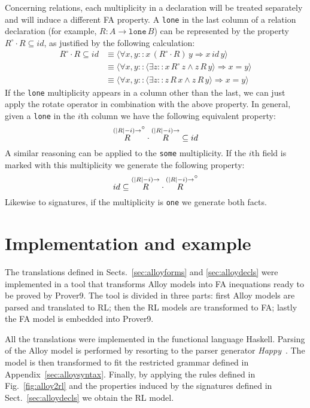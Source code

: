 \documentclass{llncs}
\begin{document}
Concerning relations, each multiplicity in a declaration will be
treated separately and will induce a different FA property. A
\texttt{lone} in the last column of a relation declaration (for
example, $R : A \rightarrow \mathtt{lone}\, B$) can be represented by
the property $R^\circ \cdot R \subseteq id$, as justified by the
following calculation:
\begin{align*}
  R^\circ \cdot R \subseteq id & \equiv \langle \forall x,y :: x\, (R^\circ \cdot R)\, y \Rightarrow x\, id\, y \rangle \\
  &  \equiv \langle \forall x,y :: \langle \exists z :: x\, R^\circ \, z \wedge z \, R\, y \rangle \Rightarrow x = y \rangle \\
  & \equiv \langle \forall x,y :: \langle \exists z :: z\, R \, x \wedge z \, R\, y \rangle \Rightarrow x = y \rangle
\end{align*}
If the \texttt{lone} multiplicity appears in a column other than the
last, we can just apply the rotate operator in combination with the above property. In general, given a \texttt{lone} in the $i$th column we have the following equivalent property:
\begin{equation*}
\nrotate{R}{(|R|-i)}^\circ \cdot \nrotate{R}{(|R|-i)} \subseteq id
\end{equation*}
A similar reasoning can be applied to the \texttt{some}
multiplicity. If the $i$th field is marked with this multiplicity we
generate the following property:
\begin{equation*}
id \subseteq \nrotate{R}{(|R|-i)} \cdot \nrotate{R}{(|R|-i)}^\circ
\end{equation*}
Likewise to signatures, if the multiplicity is \texttt{one} we generate both facts.

\section{Implementation and example}
\label{sec:example}

The translations defined in Sects.~\ref{sec:alloyforms} and
\ref{sec:alloydecls} were implemented in a tool that transforms Alloy
models into FA inequations ready to be proved by Prover9. The tool is
divided in three parts: first Alloy models are parsed and translated
to RL; then the RL models are transformed to FA; lastly the FA model
is embedded into Prover9.

All the translations were implemented in the functional language
Haskell. Parsing of the Alloy model is performed by resorting to the
parser generator \emph{Happy}~\cite{happy}. The model is then
transformed to fit the restricted grammar defined in
Appendix~\ref{sec:alloysyntax}. Finally, by applying the rules defined in
Fig.~\ref{fig:alloy2rl} and the properties induced by the signatures
defined in Sect.~\ref{sec:alloydecls} we obtain the RL model.
\end{document}
